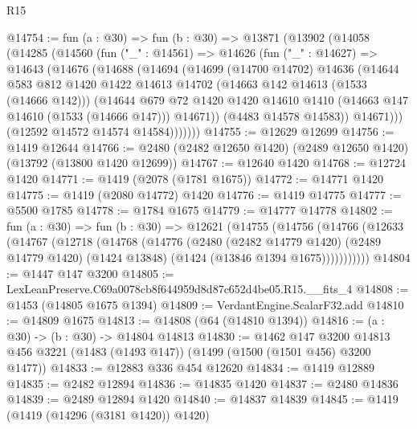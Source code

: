 \begin{lexlean}{R15}
\begin{coremodule}
@14754 := fun (a : @30) =>
  fun (b : @30) =>
  @13871
    (@13902
      (@14058
        (@14285
          (@14560
            (fun ("_" : @14561) =>
            @14626
              (fun ("_" : @14627) =>
              @14643
                (@14676
                  (@14688
                    (@14694
                      (@14699
                        (@14700 @14702)
                        @14636
                        (@14644
                          @583
                          @812
                          @1420
                          @1422
                          @14613
                          @14702
                          (@14663 @142 @14613 (@1533 (@14666 @142)))
                          (@14644
                            @679
                            @72
                            @1420
                            @1420
                            @14610
                            @1410
                            (@14663 @147 @14610 (@1533 (@14666 @147)))
                            @14671))
                        (@4483 @14578 @14583))
                      @14671)))
                (@12592 @14572 @14574 @14584)))))))
@14755 := @12629 @12699
@14756 := @1419 @12644
@14766 := @2480 (@2482 @12650 @1420) (@2489 @12650 @1420) (@13792 (@13800 @1420 @12699))
@14767 := @12640 @1420
@14768 := @12724 @1420
@14771 := @1419 (@2078 (@1781 @1675))
@14772 := @14771 @1420
@14775 := @1419 (@2080 @14772) @1420
@14776 := @1419 @14775
@14777 := @5500 @1785
@14778 := @1784 @1675
@14779 := @14777 @14778
@14802 := fun (a : @30) =>
  fun (b : @30) =>
  @12621
    (@14755
      (@14756
        (@14766
          (@12633
            (@14767
              (@12718
                (@14768
                  (@14776
                    (@2480
                      (@2482 @14779 @1420)
                      (@2489 @14779 @1420)
                      (@1424 @13848)
                      (@1424 (@13846 @1394 @1675)))))))))))
@14804 := @1447 @147 @3200
@14805 := LexLeanPreserve.C69a0078cb8f644959d8d87c652d4be05.R15.__fits_4
@14808 := @1453 (@14805 @1675 @1394)
@14809 := VerdantEngine.ScalarF32.add
@14810 := @14809 @1675
@14813 := @14808 (@64 (@14810 @1394))
@14816 := (a : @30) -> (b : @30) -> @14804 @14813
@14830 := @1462
    @147
    @3200
    @14813
    @456
    @3221
    (@1483 (@1493 @147))
    (@1499 (@1500 (@1501 @456) @3200 @1477))
@14833 := @12883 @336 @454 @12620
@14834 := @1419 @12889
@14835 := @2482 @12894
@14836 := @14835 @1420
@14837 := @2480 @14836
@14839 := @2489 @12894 @1420
@14840 := @14837 @14839
@14845 := @1419 (@1419 (@14296 (@3181 @1420)) @1420)

\end{coremodule}
\end{lexlean}
